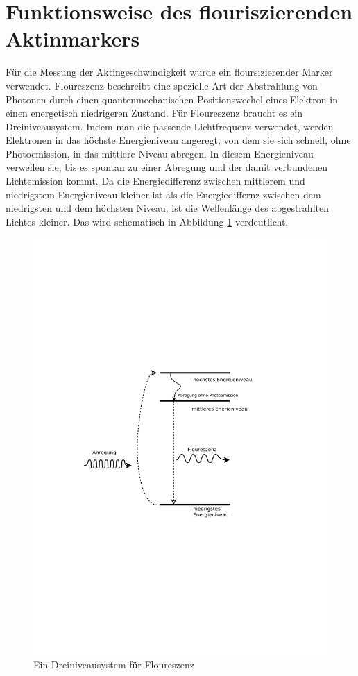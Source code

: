 \section{Funktionsweise des flouriszierenden Aktinmarkers}
Für die Messung der Aktingeschwindigkeit wurde ein floursizierender Marker verwendet.
Floureszenz beschreibt eine spezielle Art der Abstrahlung von
Photonen durch einen quantenmechanischen Positionswechel
eines Elektron in einen energetisch niedrigeren Zustand.
Für Floureszenz braucht es ein Dreiniveausystem. Indem man die passende Lichtfrequenz verwendet,
werden Elektronen in das höchste Energieniveau angeregt,
von dem sie sich schnell, ohne Photoemission, in das mittlere Niveau abregen.
In diesem Energieniveau verweilen sie, bis es spontan zu einer 
Abregung und der damit verbundenen Lichtemission kommt.
Da die Energiedifferenz zwischen mittlerem und niedrigstem Energieniveau kleiner ist als
die Energiediffernz zwischen dem niedrigsten und dem höchsten Niveau, ist die Wellenlänge
des abgestrahlten Lichtes kleiner. Das wird schematisch in Abbildung
\ref{fig:dreiniveausystem} verdeutlicht.

\begin{figure}[]
  \centering
  \includegraphics[width=\textwidth]{bilder/energieniveauschema.pdf}
  \caption{Ein Dreiniveausystem für Floureszenz}
  \label{fig:dreiniveausystem}
\end{figure}

